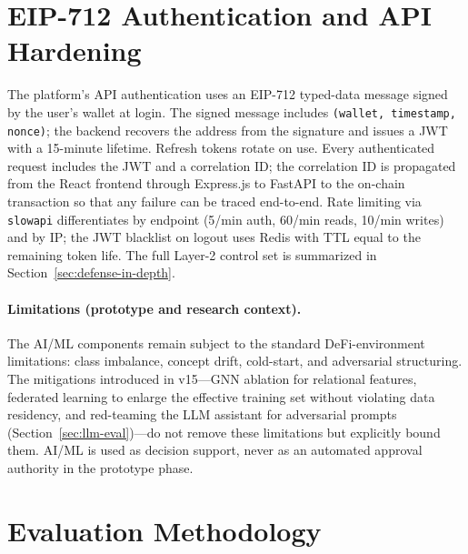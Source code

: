 \documentclass[12pt,a4paper]{report}
\begin{document}
\section{EIP-712 Authentication and API Hardening}
\label{sec:eip712-auth}

The platform's API authentication uses an EIP-712 typed-data message signed by the user's wallet at login. The signed message includes \texttt{(wallet, timestamp, nonce)}; the backend recovers the address from the signature and issues a JWT with a 15-minute lifetime. Refresh tokens rotate on use. Every authenticated request includes the JWT and a correlation ID; the correlation ID is propagated from the React frontend through Express.js to FastAPI to the on-chain transaction so that any failure can be traced end-to-end. Rate limiting via \texttt{slowapi} differentiates by endpoint (5/min auth, 60/min reads, 10/min writes) and by IP; the JWT blacklist on logout uses Redis with TTL equal to the remaining token life. The full Layer-2 control set is summarized in Section~\ref{sec:defense-in-depth}.

\paragraph{Limitations (prototype and research context).}
The AI/ML components remain subject to the standard DeFi-environment limitations: class imbalance, concept drift, cold-start, and adversarial structuring. The mitigations introduced in v15---GNN ablation for relational features, federated learning to enlarge the effective training set without violating data residency, and red-teaming the LLM assistant for adversarial prompts (Section~\ref{sec:llm-eval})---do not remove these limitations but explicitly bound them. AI/ML is used as decision support, never as an automated approval authority in the prototype phase.

\section{Evaluation Methodology}
\label{sec:eval-method}
\end{document}
